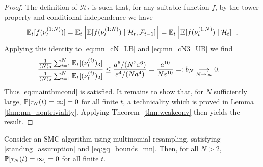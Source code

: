 \begin{proof}
The definition of $\mathcal{H}_t$ is such that, for any suitable function $f$, by the tower property and conditional independence we have
\begin{equation}
\mathbb{E}_t[ f(\nu_t^{(1:N)}) ] 
= \mathbb{E}_t\left[ \mathbb{E}[ f(\nu_t^{(1:N)}) \mid \mathcal{H}_t, \mathcal{F}_{t-1} ] \right] 
= \mathbb{E}_t\left[ \mathbb{E}[ f(\nu_t^{(1:N)}) \mid \mathcal{H}_t ] \right] .\label{eq:condexp_HtFt}
\end{equation}
Applying this identity to \eqref{eq:mn_cN_LB} and \eqref{eq:mn_cN3_UB} we find
\begin{align*}
\frac{\frac{1}{(N)_3} \sum_{i=1}^N \mathbb{E}_t[ (\nu_t^{(i)})_3 ]}{\frac{1}{(N)_2} \sum_{i=1}^N \mathbb{E}_t[ (\nu_t^{(i)})_2 ]}
&\leq \frac{ a^6 / (N^2 \varepsilon^6) }{ \varepsilon^4 / (N a^4) }
= \frac{ a^{10} }{ N\varepsilon^{10} }
=: b_N \underset{N\to\infty}{\longrightarrow} 0.
\end{align*}
Thus \eqref{eq:mainthmcond} is satisfied. 
It remains to show that, for $N$ sufficiently large, $\mathbb{P}[ \tau_N(t) = \infty ] =0$ for all finite $t$, a technicality which is proved in Lemma \ref{thm:mn_nontriviality}. 
Applying Theorem~\ref{thm:weakconv} then yields the result.
\end{proof}



\begin{lemma}\label{thm:mn_nontriviality}
Consider an SMC algorithm using multinomial resampling, satisfying \ref{standing_assumption} and \eqref{eq:gq_bounds_mn}. 
Then, for all $N>2$, $\mathbb{P}[ \tau_N(t) = \infty ]=0$ for all finite $t$.
\end{lemma}

